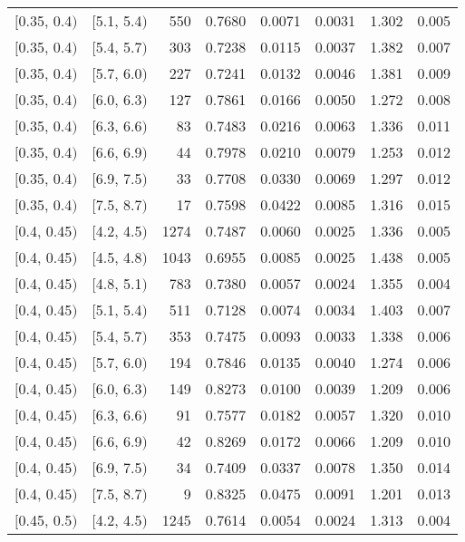 \begin{longtable}{| l | l | r | r | r | r | r | r |}
        $[$0.35, 0.4$)$ & $[$5.1, 5.4$)$ & 550 & 0.7680 & 0.0071 & 0.0031 & 1.302 & 0.005 \\
        $[$0.35, 0.4$)$ & $[$5.4, 5.7$)$ & 303 & 0.7238 & 0.0115 & 0.0037 & 1.382 & 0.007 \\
        $[$0.35, 0.4$)$ & $[$5.7, 6.0$)$ & 227 & 0.7241 & 0.0132 & 0.0046 & 1.381 & 0.009 \\
        $[$0.35, 0.4$)$ & $[$6.0, 6.3$)$ & 127 & 0.7861 & 0.0166 & 0.0050 & 1.272 & 0.008 \\
        $[$0.35, 0.4$)$ & $[$6.3, 6.6$)$ & 83 & 0.7483 & 0.0216 & 0.0063 & 1.336 & 0.011 \\
        $[$0.35, 0.4$)$ & $[$6.6, 6.9$)$ & 44 & 0.7978 & 0.0210 & 0.0079 & 1.253 & 0.012 \\
        $[$0.35, 0.4$)$ & $[$6.9, 7.5$)$ & 33 & 0.7708 & 0.0330 & 0.0069 & 1.297 & 0.012 \\
        $[$0.35, 0.4$)$ & $[$7.5, 8.7$)$ & 17 & 0.7598 & 0.0422 & 0.0085 & 1.316 & 0.015 \\
        $[$0.4, 0.45$)$ & $[$4.2, 4.5$)$ & 1274 & 0.7487 & 0.0060 & 0.0025 & 1.336 & 0.005 \\
        $[$0.4, 0.45$)$ & $[$4.5, 4.8$)$ & 1043 & 0.6955 & 0.0085 & 0.0025 & 1.438 & 0.005 \\
        $[$0.4, 0.45$)$ & $[$4.8, 5.1$)$ & 783 & 0.7380 & 0.0057 & 0.0024 & 1.355 & 0.004 \\
        $[$0.4, 0.45$)$ & $[$5.1, 5.4$)$ & 511 & 0.7128 & 0.0074 & 0.0034 & 1.403 & 0.007 \\
        $[$0.4, 0.45$)$ & $[$5.4, 5.7$)$ & 353 & 0.7475 & 0.0093 & 0.0033 & 1.338 & 0.006 \\
        $[$0.4, 0.45$)$ & $[$5.7, 6.0$)$ & 194 & 0.7846 & 0.0135 & 0.0040 & 1.274 & 0.006 \\
        $[$0.4, 0.45$)$ & $[$6.0, 6.3$)$ & 149 & 0.8273 & 0.0100 & 0.0039 & 1.209 & 0.006 \\
        $[$0.4, 0.45$)$ & $[$6.3, 6.6$)$ & 91 & 0.7577 & 0.0182 & 0.0057 & 1.320 & 0.010 \\
        $[$0.4, 0.45$)$ & $[$6.6, 6.9$)$ & 42 & 0.8269 & 0.0172 & 0.0066 & 1.209 & 0.010 \\
        $[$0.4, 0.45$)$ & $[$6.9, 7.5$)$ & 34 & 0.7409 & 0.0337 & 0.0078 & 1.350 & 0.014 \\
        $[$0.4, 0.45$)$ & $[$7.5, 8.7$)$ & 9 & 0.8325 & 0.0475 & 0.0091 & 1.201 & 0.013 \\
        $[$0.45, 0.5$)$ & $[$4.2, 4.5$)$ & 1245 & 0.7614 & 0.0054 & 0.0024 & 1.313 & 0.004 \\

\end{longtable}
